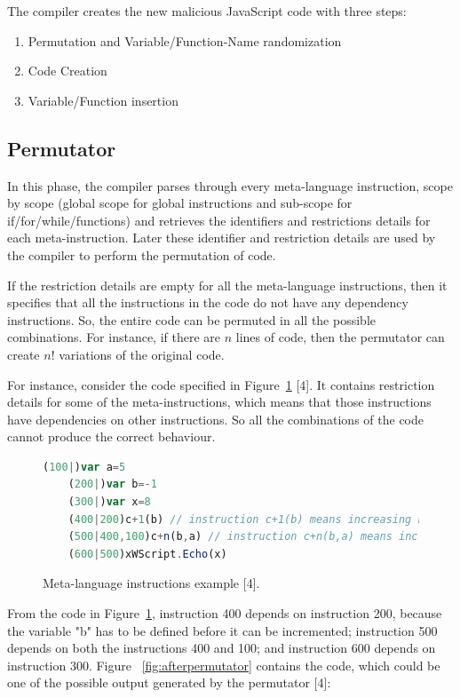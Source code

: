 The compiler creates the new malicious JavaScript code with three steps:

\begin{enumerate}
  \item Permutation and Variable/Function-Name randomization
  \item Code Creation
  \item Variable/Function insertion
\end{enumerate}

\subsection{Permutator}

In this phase, the compiler parses through every meta-language instruction, scope by scope (global scope for global instructions and sub-scope for if/for/while/functions) and retrieves the identifiers and restrictions details for each meta-instruction. Later these identifier and restriction details are used by the compiler to perform the permutation of code.

If the restriction details are empty for all the meta-language instructions, then it specifies that all the instructions in the code do not have any dependency instructions. So, the entire code can be permuted in all the possible combinations. For instance, if there are $n$ lines of code, then the permutator can create $n!$ variations of the original code. 

For instance, consider the code specified in Figure~\ref{fig:permutator} [4]. It contains restriction details for some of the meta-instructions, which means that those instructions have dependencies on other instructions. So all the combinations of the code cannot produce the correct behaviour. 


\begin{figure}
  \centering
  \begin{lstlisting}[language=JavaScript]
	(100|)var a=5
	(200|)var b=-1
	(300|)var x=8
	(400|200)c+1(b)	// instruction c+1(b) means increasing b by 1: i.e. b++
	(500|400,100)c+n(b,a) // instruction c+n(b,a) means increasing b by a: i.e. b+=a
	(600|500)xWScript.Echo(x)
\end{lstlisting}


    \caption[Meta-language instructions example]{Meta-language instructions example [4].}
    \label{fig:permutator}
\end{figure}


From the code in Figure~\ref{fig:permutator}, instruction 400 depends on instruction 200, because the variable "b" has to be defined before it can be incremented; instruction 500 depends on both the instructions 400 and 100; and instruction 600 depends on instruction 300. Figure ~\ref{fig:afterpermutator} contains the code, which could be one of the possible output generated by the permutator [4]:


